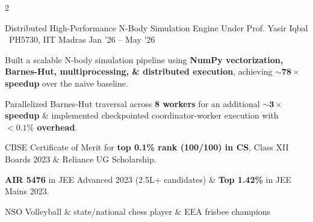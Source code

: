 \documentclass{resume}
\begin{document}
\begin{paracol}{2}
{\begin{resumeItemize}
\end{resumeItemize}
}
{\href{https://github.com/hemanthdatta/minivision}{\faGithub}}

\resumeDivider

\resumeProject
{Distributed High-Performance N-Body Simulation Engine \href{https://hemanthdatta.github.io/comp-phy-proj/}{\small\faGlobe}}
{Under Prof. Yasir Iqbal \textbar\ PH5730, IIT Madras}
{Jan '26 -- May '26}
{
\begin{resumeItemize}

\item Built a scalable N-body simulation pipeline using
\textbf{NumPy vectorization, Barnes-Hut, multiprocessing,
\& distributed execution},
achieving \textbf{$\mathbf{\sim 78\times}$ speedup}
over the naive baseline.

\item Parallelized Barnes-Hut traversal across
\textbf{8 workers} for an additional
\textbf{$\mathbf{\sim 3\times}$ speedup}
\& implemented checkpointed coordinator-worker execution with
\textbf{$<0.1\%$ overhead}.

\end{resumeItemize}
}
{\href{https://github.com/hemanthdatta/comp-phy-proj}{\faGithub}}


\begin{resumeItemize}

\item CBSE Certificate of Merit for
\textbf{top 0.1\% rank (100/100) in CS},
Class XII Boards 2023 \& Reliance UG Scholarship.

\item \textbf{AIR 5476} in JEE Advanced 2023
(2.5L+ candidates) \& \textbf{Top 1.42\%}
in JEE Mains 2023.

\end{resumeItemize}


\begin{resumeItemize}
\item NSO Volleyball \& state/national chess player
\& EEA frisbee champions
\end{resumeItemize}

\end{paracol}
\end{document}
